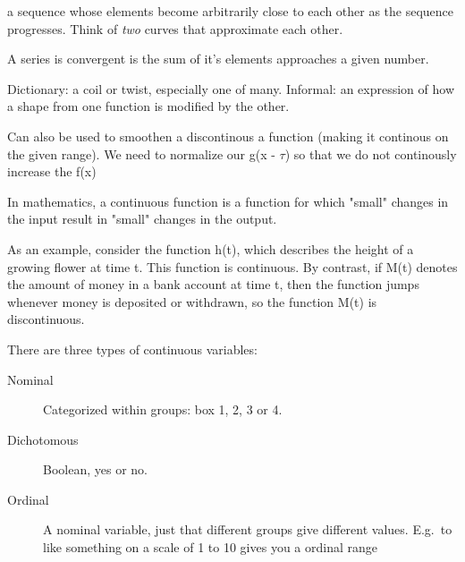 \begin{definition}
    a sequence whose elements become arbitrarily close to each other as the
    sequence progresses.
    Think of \textit{two} curves that approximate each other.

\end{definition}

\begin{definition}[Convergence]\label{convergence}
    A series is convergent is the sum of it's elements approaches a given 
    number.
\end{definition}

\begin{definition}[Convolution]
    Dictionary: a coil or twist, especially one of many.\newline
    Informal: an expression of how a shape from one function is modified by 
        the other.

    Can also be used to smoothen a discontinous a function (making it continous 
    on the given range). We need to normalize our g(x - $\tau$) so that we do
    not continously increase the f(x)
\end{definition}

\begin{definition}[Continuous]
In mathematics, a continuous function is a function for which
"small" changes in the input result in "small" changes in the output.

As an example, consider the function h(t), which describes the height of a
growing flower at time t. This function is continuous. By contrast, if M(t)
denotes the amount of money in a bank account at time t, then the function
jumps whenever money is deposited or withdrawn, so the function M(t) is
discontinuous.

\end{definition}

\begin{definition}
    There are three types of continuous variables:
    \begin{center}
    \begin{description}
        \item[Nominal] Categorized within groups: box 1, 2, 3 or 4.
        \item[Dichotomous] Boolean, yes or no.
        \item[Ordinal] A nominal variable, just that different groups give
            different values. E.g.\ to like something on a scale of 1 to 10
            gives you a ordinal range
    \end{description}
\end{center}
\end{definition}


